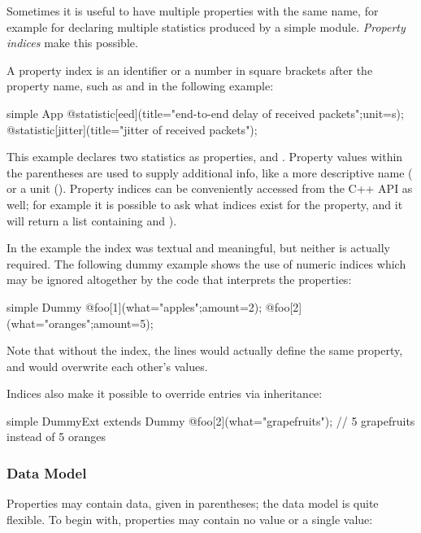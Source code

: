 Sometimes it is useful to have multiple properties with the same name,
for example for declaring multiple statistics produced by a simple module.
\textit{Property indices} make this possible.

A property index is an identifier or a number in square brackets after the
property name, such as  and  in the following example:

\begin{ned}
simple App {
    @statistic[eed](title="end-to-end delay of received packets";unit=s);
    @statistic[jitter](title="jitter of received packets");
}
\end{ned}

This example declares two statistics as  properties,
 and . Property values within
the parentheses are used to supply additional info, like a more
descriptive name ( or a unit ().
Property indices can be conveniently accessed from the C++ API as
well; for example it is possible to ask what indices exist for the
 property, and it will return a list containing
 and ).

In the  example the index was textual and meaningful,
but neither is actually required. The following dummy example
shows the use of numeric indices which may be ignored altogether
by the code that interprets the properties:

\begin{ned}
simple Dummy {
    @foo[1](what="apples";amount=2);
    @foo[2](what="oranges";amount=5);
}
\end{ned}

Note that without the index, the lines would actually define the
same  property, and would overwrite each other's values.

Indices also make it possible to override entries via inheritance:

\begin{ned}
simple DummyExt extends Dummy {
    @foo[2](what="grapefruits"); // 5 grapefruits instead of 5 oranges
}
\end{ned}


\subsubsection{Data Model}

Properties may contain data, given in parentheses; the data model is quite
flexible. To begin with, properties may contain no value or a single
value:

